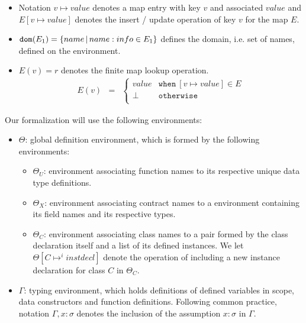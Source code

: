 \documentclass[a4paper, 11pt]{article}
\begin{document}
\begin{itemize}
  \item Notation $v \mapsto value$ denotes a map entry with 
    key $v$ and associated $value$ and $E[v\mapsto value]$ denotes 
    the insert / update operation of key $v$ for the 
    map $E$.
  \item $\mathtt{dom}(E_1) = \{name\,|\,name : info \in E_1\}$ defines the 
    domain, i.e. set of names, defined on the environment.
  \item $E(v) = r$ denotes the finite map lookup operation. 
    \[
      \begin{array}{lcl}
        E(v) & = & \left\{
                     \begin{array}{ll}
                       value & \mathtt{when }\:[v \mapsto value] \in E\\
                       \bot  & \mathtt{otherwise}\\
                     \end{array}
                   \right. 
      \end{array}
    \]
\end{itemize}

Our formalization will use the following environments:

\begin{itemize}
  \item $\Theta$: global definition environment, which is formed by the 
    following environments:
    \begin{itemize}
      \item $\Theta_U$: environment associating function names to 
        its respective unique data type definitions.
      \item $\Theta_X$: environment associating contract names to 
        a environment containing its field names and its respective 
        types.
      \item $\Theta_C$: environment associating class names to 
        a pair formed by the class declaration itself and a 
        list of its defined instances. We let $\Theta[C \mapsto^i instdecl]$ 
        denote the operation of including a new instance declaration 
        for class $C$ in $\Theta_C$.
    \end{itemize}
  \item $\Gamma$: typing environment, which holds definitions of 
        defined variables in scope, data constructors and 
        function definitions. Following common practice, 
        notation $\Gamma, x : \sigma$ denotes the inclusion 
        of the assumption $x : \sigma$ in $\Gamma$.
\end{itemize}
\end{document}
